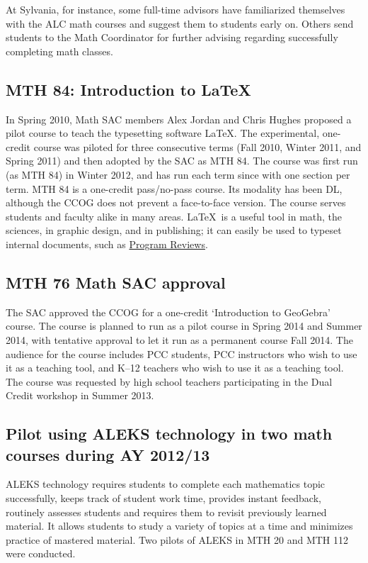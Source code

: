 
At Sylvania, for instance, some full-time advisors have familiarized themselves with the ALC math courses and suggest them to students early on.
Others send students to the Math Coordinator for further advising regarding successfully completing math classes.

\subsection{MTH 84: Introduction to \LaTeX}\label{other:sec:mth84}
In Spring 2010, Math SAC members Alex Jordan and Chris Hughes proposed a pilot course to teach the typesetting software \LaTeX.
The experimental, one-credit course was piloted for three consecutive terms (Fall 2010, Winter 2011, and Spring 2011) and then adopted by the SAC as MTH 84.
The course was first run (as MTH 84) in Winter 2012, and has run each term since with one section per term.
MTH 84 is a one-credit pass/no-pass course.
Its modality has been DL, although the CCOG does not prevent a face-to-face version.
The course serves students and faculty alike in many areas.
\LaTeX\ is a useful tool in math, the sciences, in graphic design, and in
publishing; it can easily be used to typeset internal documents, such as \href{http://www.youtube.com/watch?v=XhduoHOYXUY}{\color{black}
	Program Reviews}.

\subsection{MTH 76 Math SAC approval}
The SAC approved the CCOG for a one-credit `Introduction to GeoGebra' course.
The course is planned to run as a pilot course in Spring 2014 and Summer 2014, with tentative approval to let it run as a permanent course Fall 2014.
The audience for the course includes PCC students, PCC instructors who wish to use it as a teaching tool, and K--12 teachers who wish to use it as a teaching tool.
The course was requested by high school teachers participating in the Dual Credit workshop in Summer 2013.

\subsection[ALEKS pilot]{Pilot using ALEKS technology in two math courses during AY 2012/13}\label{sec3:subset:alekspilot}
ALEKS technology requires students to complete each mathematics topic successfully, keeps track of student work time, provides instant feedback, routinely assesses students and requires them to revisit previously learned material.
It allows students to study a variety of topics at a time and minimizes practice of mastered material.
Two pilots of ALEKS in MTH 20 and MTH 112 were conducted.

